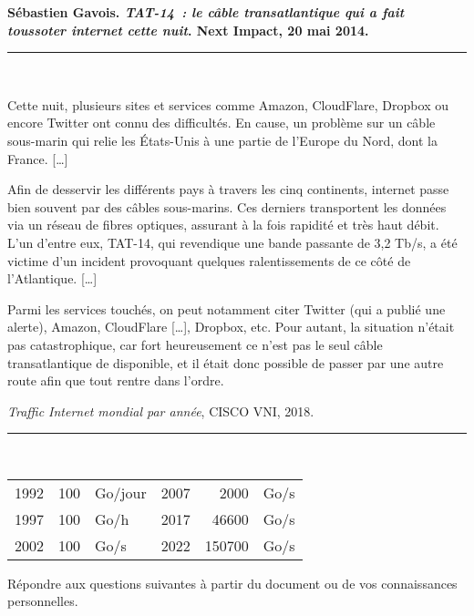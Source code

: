 \documentclass[11pt]{article}
\newcommand{\ellipse}{[…]\xspace}
\begin{document}
\begin{mdframed}[style=citationstyle]
  \textbf{Sébastien Gavois. \emph{TAT-14 : le câble transatlantique qui a fait toussoter internet cette nuit}. Next Impact, 20 mai 2014.}
  ~\hrule~

Cette nuit, plusieurs sites et services comme Amazon, CloudFlare, Dropbox ou encore Twitter ont connu des difficultés. En cause, un problème sur un câble sous-marin qui relie les États-Unis à une partie de l'Europe du Nord, dont la France. \ellipse

Afin de desservir les différents pays à travers les cinq continents, internet passe bien souvent par des câbles sous-marins. Ces derniers transportent les données via un réseau de fibres optiques, assurant à la fois rapidité et très haut débit. L'un d'entre eux, TAT-14, qui revendique une bande passante de 3,2 Tb/s, a été victime d'un incident provoquant quelques ralentissements de ce côté de l'Atlantique. \ellipse

Parmi les services touchés, on peut notamment citer Twitter (qui a publié une alerte), Amazon, CloudFlare \ellipse, Dropbox, etc. Pour autant, la situation n'était pas catastrophique, car fort heureusement ce n'est pas le seul câble transatlantique de disponible, et il était donc possible de passer par une autre route afin que tout rentre dans l'ordre.
\end{mdframed}

\begin{mdframed}[style=citationstyle]
  \emph{Traffic Internet mondial par année}, CISCO VNI, 2018.
  ~\hrule~

    \begin{center}
      \begin{tabular}{rr@{\,}lrr@{\,}l}
    \toprule
    1992 & 100 & \si{Go/jour} & 2007 & 2000 & \si{Go/s} \\
    1997 & 100 & \si{Go/h}    & 2017 & 46600 & \si{Go/s} \\
    2002 & 100 & \si{Go/s}    & 2022 & 150700 & \si{Go/s} \\
    \bottomrule
  \end{tabular}
\end{center}
\end{mdframed}

Répondre aux questions suivantes à partir du document ou de vos connaissances personnelles.
\end{document}
